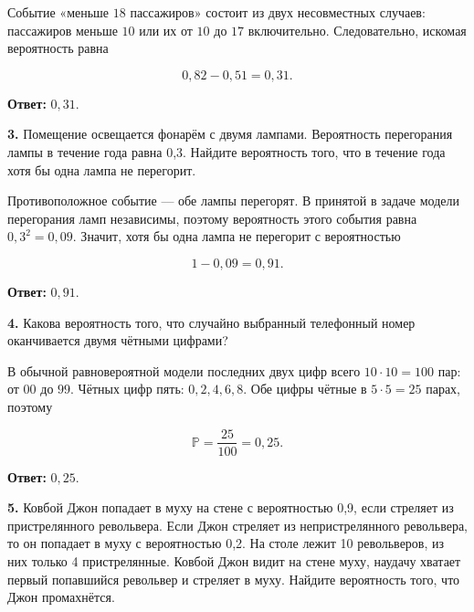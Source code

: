 \begin{solution}\label{solution-problem-solving-practice-homework-2}
Событие «меньше $18$ пассажиров» состоит из двух несовместных случаев: пассажиров меньше $10$ или их от $10$ до $17$ включительно. Следовательно, искомая вероятность равна

\[0{,}82-0{,}51=0{,}31.\]

\textbf{Ответ:} $0{,}31$.
\end{solution}

\begin{task}\label{task-homework-3}
\textbf{3.} Помещение освещается фонарём с двумя лампами. Вероятность перегорания лампы в течение года равна 0,3. Найдите вероятность того, что в течение года хотя бы одна лампа не перегорит.
\end{task}

\begin{solution}\label{solution-problem-solving-practice-homework-3}
Противоположное событие — обе лампы перегорят. В принятой в задаче модели перегорания ламп независимы, поэтому вероятность этого события равна $0{,}3^2=0{,}09$. Значит, хотя бы одна лампа не перегорит с вероятностью

\[1-0{,}09=0{,}91.\]

\textbf{Ответ:} $0{,}91$.
\end{solution}

\begin{task}\label{task-homework-4}
\textbf{4.} Какова вероятность того, что случайно выбранный телефонный номер оканчивается двумя чётными цифрами?
\end{task}

\begin{solution}\label{solution-problem-solving-practice-homework-4}
В обычной равновероятной модели последних двух цифр всего $10\cdot10=100$ пар: от $00$ до $99$. Чётных цифр пять: $0,2,4,6,8$. Обе цифры чётные в $5\cdot5=25$ парах, поэтому

\[\mathbb P=\frac{25}{100}=0{,}25.\]

\textbf{Ответ:} $0{,}25$.
\end{solution}

\begin{task}\label{task-homework-5}
\textbf{5.} Ковбой Джон попадает в муху на стене с вероятностью 0,9, если стреляет из пристрелянного револьвера. Если Джон стреляет из непристрелянного револьвера, то он попадает в муху с вероятностью 0,2. На столе лежит 10 револьверов, из них только 4 пристрелянные. Ковбой Джон видит на стене муху, наудачу хватает первый попавшийся револьвер и стреляет в муху. Найдите вероятность того, что Джон промахнётся.
\end{task}


